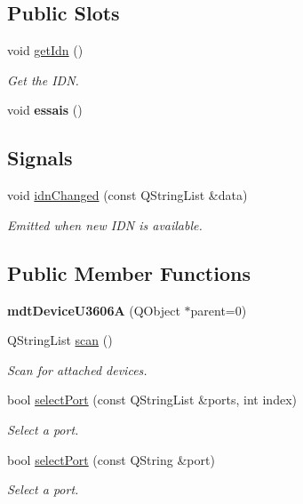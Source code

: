 \subsection*{Public Slots}
\begin{DoxyCompactItemize}
\item 
void \hyperlink{classmdt_device_u3606_a_ad79d17e348854963cf32b20d370a778e}{getIdn} ()
\begin{DoxyCompactList}\small\item\em Get the IDN. \end{DoxyCompactList}\item 
\hypertarget{classmdt_device_u3606_a_a41eacb2d6bc5f9a056ba9d68ffdaeba7}{
void {\bfseries essais} ()}
\label{classmdt_device_u3606_a_a41eacb2d6bc5f9a056ba9d68ffdaeba7}

\end{DoxyCompactItemize}
\subsection*{Signals}
\begin{DoxyCompactItemize}
\item 
void \hyperlink{classmdt_device_u3606_a_a0a5ed6583bdf5378787e24349776d7a1}{idnChanged} (const QStringList \&data)
\begin{DoxyCompactList}\small\item\em Emitted when new IDN is available. \end{DoxyCompactList}\end{DoxyCompactItemize}
\subsection*{Public Member Functions}
\begin{DoxyCompactItemize}
\item 
\hypertarget{classmdt_device_u3606_a_a91201ae14df7b553a947b5857eaa1c65}{
{\bfseries mdtDeviceU3606A} (QObject $\ast$parent=0)}
\label{classmdt_device_u3606_a_a91201ae14df7b553a947b5857eaa1c65}

\item 
QStringList \hyperlink{classmdt_device_u3606_a_a3a31558c573466fc1534b43e6ee7e327}{scan} ()
\begin{DoxyCompactList}\small\item\em Scan for attached devices. \end{DoxyCompactList}\item 
bool \hyperlink{classmdt_device_u3606_a_a425f1d22686be2d28eb3f1ce12a8eaee}{selectPort} (const QStringList \&ports, int index)
\begin{DoxyCompactList}\small\item\em Select a port. \end{DoxyCompactList}\item 
bool \hyperlink{classmdt_device_u3606_a_af4ee162df6c67ee3b2d9e5877bea881e}{selectPort} (const QString \&port)
\begin{DoxyCompactList}\small\item\em Select a port. \end{DoxyCompactList}\end{DoxyCompactItemize}


